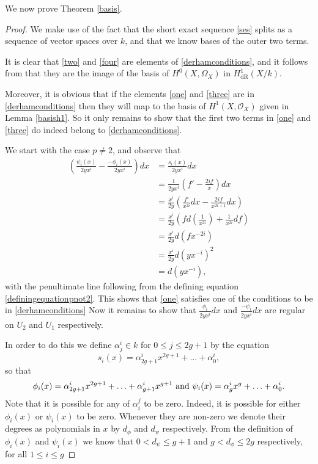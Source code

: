 \documentclass[draft, 11pt]{article} %
\theoremstyle{plain}
\theoremstyle{remark}
\newcommand{\hone}{H^1(X,\mathcal{O}_X)}
\newcommand{\derhamhone}{H_{\text {dR}}^1(X/k)}
\begin{document}
We now prove Theorem \ref{basis}.

\begin{proof}
We make use of the fact that the short exact sequence \eqref{ses} splits as a sequence of vector spaces over $k$, and that we know bases of the outer two terms.

It is clear that \eqref{two} and \eqref{four} are elements of \eqref{derhamconditions}, and it follows from \cite[Thm 6.1]{faithfulaction} that they are the image of the basis of $H^0(X,\Omega_X)$ in $\derhamhone$.

Moreover, it is obvious that if the elements \eqref{one} and \eqref{three} are in \eqref{derhamconditions} then they will map to the basis of $\hone$ given in Lemma \ref{basish1}.
So it only remains to show that the first two terms in \eqref{one} and \eqref{three} do indeed belong to \eqref{derhamconditions}.


We start with the case $p\neq 2$, and observe that
\begin{align*}
\left(  \frac{\psi_i(x)}{2yx^i}  - \frac{-\phi_i(x)}{2yx^i} \right) dx & =  \frac{s_i(x)}{2yx^i} dx \\
& =  \frac{1}{2yx^i} \left( f' - \frac{2if}{x} \right) dx \\
& =  \frac{x^i}{2y} \left( \frac{f'}{x^{2i}}dx -\frac{2if}{x^{2i+1}} dx \right) \\
& =  \frac{x^i}{2y} \left( fd\left(\frac{1}{x^{2i}}\right) + \frac{1}{x^{2i}}df \right) \\
& =  \frac{x^i}{2y}d(fx^{-2i}) \\
& =  \frac{x^i}{2y} d\left(yx^{-i}\right)^2 \\
& =  d(yx^{-i}),
\end{align*}
with the penultimate line following from the defining equation \eqref{definingequationpnot2}.
This shows that \eqref{one} satisfies one of the conditions to be in \eqref{derhamconditions}
Now it remains to show that $\frac{\phi_i}{2yx^i}dx$ and $\frac{-\psi_i}{2yx^i}dx$ are regular on $U_2$ and $U_1$ respectively.



In order to do this we define $\alpha^i_j \in k$ for $0\leq j \leq 2g+1$ by the equation
\[
s_i(x) = \alpha^i_{2g+1}x^{2g+1} + \ldots + \alpha^i_0,
\]
so that
\[
\phi_i(x) = \alpha^i_{2g+1}x^{2g+1} + \ldots + \alpha^i_{g+1}x^{g+1} \ {\rm and } \ \psi_i(x) = \alpha^i_gx^g + \ldots + \alpha^i_0.
\]
Note that it is possible for any of $\alpha_i^j$ to be zero. Indeed, it is possible for either $\phi_i(x)$ or $\psi_i(x)$ to be zero.
Whenever they are non-zero we denote their degrees as polynomials in $x$ by $d_\phi$ and $d_\psi$ respectively. From the definition of $\phi_i(x)$ and $\psi_i(x)$ we know that $0 < d_\psi \leq g+1$ and $g < d_\phi \leq 2g$ respectively, for all $1 \leq i \leq g$



\end{proof}
\end{document}
